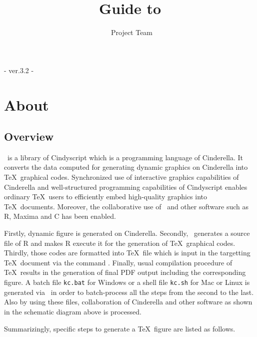\documentclass[papersize,a4paper,12pt]{article}
\begin{document}
\title{Guide to \ketcindy}
\author{\ketcindy\ Project Team}
\maketitle

\begin{center}  - ver.3.2 -\end{center}

\hypertarget{index}{}
\tableofcontents

\newpage

\section{About \ketcindy}

\subsection{Overview}

\ketcindy\ is a library of Cindyscript 
which is a programming language of Cinderella. 
It converts the data computed 
for generating dynamic graphics on Cinderella 
into \TeX\ graphical codes. 
Synchronized use of 
interactive graphics capabilities of Cinderella 
and well-structured programming capabilities of Cindyscript 
enables ordinary \TeX\ users to efficiently embed 
high-quality graphics into \TeX\ documents. 
Moreover, the collaborative use of \ketcindy\ 
and other software such as R, Maxima and C 
has been enabled.

\begin{center}

\end{center}

Firstly, dynamic figure is generated on Cinderella. 
Secondly, \ketcindy\ generates 
a source file of R and makes R execute it 
for the generation of \TeX\ graphical codes. 
Thirdly, those codes are formatted into 
\TeX\ file which is input in the targetting \TeX\ document 
via the command \verb||. 
Finally, usual compilation procedure of \TeX\ results in 
the generation of final PDF output 
including the corresponding figure. 
A batch file \verb|kc.bat| for Windows 
or a shell file \verb|kc.sh| for Mac or Linux 
is generated via \ketcindy\ 
in order to batch-process all the steps 
from the second to the last. 
Also by using these files, 
collaboration of Cinderella and other software 
as shown in the schematic diagram above 
is processed. 

Summarizingly, specific steps to generate a \TeX\ figure 
are listed as follows.
\end{document}
